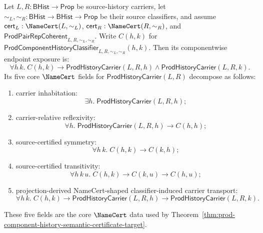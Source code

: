 \begin{theorem}
\label{thm:prod-component-history-classifier-certificate-target}
Let $L,R:\mathsf{BHist}\to\mathsf{Prop}$ be source-history carriers, let
$\sim_L,\sim_R:\mathsf{BHist}\to\mathsf{BHist}\to\mathsf{Prop}$ be their source
classifiers, and assume $\mathsf{cert}_L:\NameCert(L,\sim_L)$,
$\mathsf{cert}_R:\NameCert(R,\sim_R)$, and
$\mathsf{ProdPairRepCoherent}_{L,R,\sim_L,\sim_R}$. Write
$C(h,k)$ for
$\mathsf{ProdComponentHistoryClassifier}_{L,R,\sim_L,\sim_R}(h,k)$. Then its
componentwise endpoint exposure is:
$$
\forall h\,k.\;C(h,k)\to\mathsf{ProdHistoryCarrier}(L,R,h)\land
\mathsf{ProdHistoryCarrier}(L,R,k).
$$
Its five core $\NameCert$ fields for $\mathsf{ProdHistoryCarrier}(L,R)$
decompose as follows:
\begin{enumerate}
  \item carrier inhabitation:
  $$
  \exists h.\;\mathsf{ProdHistoryCarrier}(L,R,h);
  $$
  \item carrier-relative reflexivity:
  $$
  \forall h.\;\mathsf{ProdHistoryCarrier}(L,R,h)\to C(h,h);
  $$
  \item source-certified symmetry:
  $$
  \forall h\,k.\;C(h,k)\to C(k,h);
  $$
  \item source-certified transitivity:
  $$
  \forall h\,k\,u.\;C(h,k)\to C(k,u)\to C(h,u);
  $$
  \item projection-derived NameCert-shaped classifier-induced carrier
  transport:
  $$
  \forall h\,k.\;C(h,k)\to\mathsf{ProdHistoryCarrier}(L,R,h)\to
  \mathsf{ProdHistoryCarrier}(L,R,k).
  $$
\end{enumerate}
These five fields are the core $\NameCert$ data used by
Theorem~\ref{thm:prod-component-history-semantic-certificate-target}.
\end{theorem}
